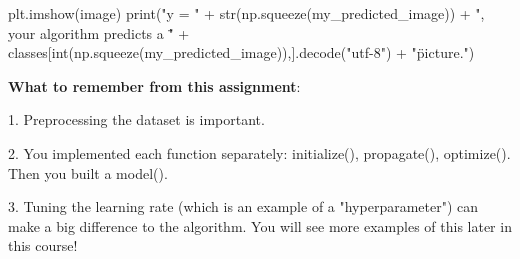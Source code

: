{\begin{mypython}
plt.imshow(image)
print("y = " + str(np.squeeze(my_predicted_image)) + ", your algorithm predicts a \"" + classes[int(np.squeeze(my_predicted_image)),].decode("utf-8") +  "\" picture.")
\end{mypython}


{\color{red}\textbf {What to remember from this assignment}}:

1. Preprocessing the dataset is important.

2. You implemented each function separately: initialize(), propagate(), optimize(). Then you built a model().

3. Tuning the learning rate (which is an example of a "hyperparameter") can make a big difference to the algorithm. You will see more examples of this later in this course!
}


\clearpage



